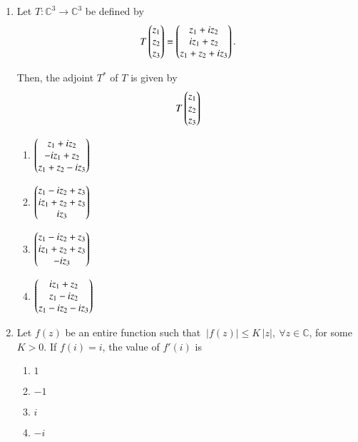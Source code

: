 \documentclass[journal]{IEEEtran}
\numberwithin{equation}{enumi}
\numberwithin{figure}{enumi}
\begin{document}
\begin{enumerate}
\item Let $T:\mathbb{C}^3 \to \mathbb{C}^3$ be defined by 
\begin{align*}
T \begin{pmatrix}z_1 \\ z_2 \\ z_3 \end{pmatrix} =
\begin{pmatrix}
z_1 + i z_2 \\
i z_1 + z_2 \\
z_1 + z_2 + i z_3\end{pmatrix}
.\end{align*}

Then, the adjoint $T^*$ of $T$ is given by 
\hfill{}
\begin{align*}
  T \begin{pmatrix} z_1 \\ z_2 \\ z_3 \end{pmatrix}  
\end{align*}
\begin{multicols}{4}
\begin{enumerate}
\item  $\begin{pmatrix} z_1 + i z_2 \\ -i z_1 + z_2 \\ z_1 + z_2 - i z_3\end{pmatrix}$
\item  $\begin{pmatrix} z_1 - i z_2 + z_3 \\ i z_1 + z_2 + z_3 \\ i z_3 \end{pmatrix}$
\item  $\begin{pmatrix} z_1 - i z_2 + z_3 \\ i z_1 + z_2 + z_3 \\ -i z_3 \end{pmatrix}$
\item  $\begin{pmatrix} i z_1 + z_2 \\ z_1 - i z_2 \\ z_1 - i z_2 - i z_3\end{pmatrix}$
\end{enumerate}
\end{multicols}

\item Let $f(z)$ be an entire function such that $\ |f(z)| \leq K\,|z|,\ \forall z \in \mathbb{C}$, for some $K>0$.
If $f(i) = i$, the value of $f'(i)$ is
\hfill{}
\begin{multicols}{4}
\begin{enumerate}
\item  $1$ \hspace{2cm}
\item  $-1$ \hspace{2cm}
\item  $i$ \hspace{2cm}
\item  $-i$
\end{enumerate}
\end{multicols}


\end{enumerate}
\end{document}
